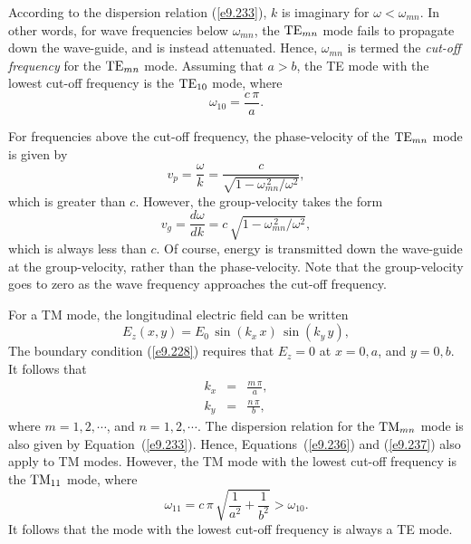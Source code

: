 According to the dispersion relation (\ref{e9.233}), $k$ is imaginary for
$\omega < \omega_{mn}$. In other words, for
wave frequencies below $\omega_{mn}$, the ${\rm TE}_{mn}$ mode
fails to propagate down the wave-guide, and is instead attenuated.  Hence, $\omega_{mn}$
is termed the {\em cut-off frequency} for the ${\rm TE}_{mn}$ mode.
Assuming that $a>b$, the TE mode with the lowest cut-off frequency is
the ${\rm TE}_{10}$ mode, where
\begin{equation}
\omega_{10} = \frac{c\,\pi}{a}.
\end{equation}

For frequencies above the cut-off frequency, the phase-velocity of the
${\rm TE}_{mn}$ mode is given by
\begin{equation}\label{e9.236}
v_p = \frac{\omega}{k} = \frac{c}{\sqrt{1-\omega_{mn}^{\,2}/\omega^2}},
\end{equation}
which is greater than $c$. However, the group-velocity takes the form
\begin{equation}\label{e9.237}
v_g = \frac{d\omega}{d k} = c\,\sqrt{1-\omega_{mn}^{\,2}/\omega^2},
\end{equation}
which is always less than $c$. Of course, energy is transmitted down the wave-guide
at the group-velocity, rather than the phase-velocity. Note that the group-velocity goes to zero as the
wave frequency approaches the cut-off frequency.

For a TM mode, the longitudinal electric field  can be written
\begin{equation}
E_z(x,y) = E_0\,\sin(k_x\,x)\,\sin(k_y\,y),
\end{equation}
The boundary condition (\ref{e9.228}) requires that
$E_z=0$ at $x=0, a$, and $y=0, b$. It follows that
\begin{eqnarray}
k_x &=& \frac{m\,\pi}{a},\\[0.5ex]
k_y&=& \frac{n\,\pi}{b},
\end{eqnarray}
where $m=1, 2, \cdots$, and $n=1, 2, \cdots$. The dispersion relation
for the ${\rm TM}_{mn}$ mode is also given by Equation~(\ref{e9.233}). 
Hence, Equations~(\ref{e9.236}) and (\ref{e9.237}) also apply to TM modes.
However, the TM mode with the lowest cut-off frequency is the
${\rm TM}_{11}$ mode, where
\begin{equation}
\omega_{11} = c\,\pi\,\sqrt{\frac{1}{a^2}+\frac{1}{b^2}}>\omega_{10}.
\end{equation}
It follows that the mode with the lowest cut-off frequency is always
a TE mode.

